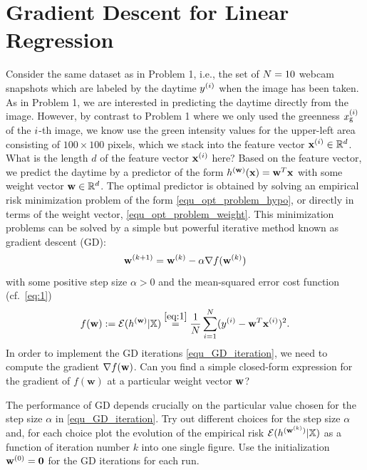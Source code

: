 \documentclass[article,11pt]{article}
\begin{document}
\section{Gradient Descent for Linear Regression}
Consider the same dataset as in Problem 1, i.e., the set of $N=10$ webcam snapshots which are labeled by the daytime $y^{(i)}$ 
when the image has been taken. As in Problem 1, we are interested in predicting the daytime directly from the image. However, by contrast 
to Problem 1 where we only used the greenness $x_{\rm g}^{(i)}$ of the $i$-th image, we know use the green intensity 
values for the upper-left area consisting of $100 \times 100$ pixels, 
which we stack into the feature vector ${\bf x}^{(i)} \in \mathbb{R}^{d}$. What is the length $d$ of the feature vector ${\bf x}^{(i)}$ here? 
Based on the feature vector, we predict the daytime by a predictor of the form $h^{({\bf w})}({\bf x}) = {\bf w}^{T} {\bf x}$ with some weight vector ${\bf w} \in \mathbb{R}^{d}$. 
The optimal predictor is obtained by solving an empirical risk minimization problem of the form \eqref{equ_opt_problem_hypo}, 
or directly in terms of the weight vector, \eqref{equ_opt_problem_weight}. This minimization problems can be solved by a simple but powerful iterative method 
known as gradient descent (GD): 
\vspace*{-2mm}
\begin{equation}
\label{equ_GD_iteration}
    \vw^{(k+1)} = \vw^{(k)} - \alpha \nabla f(\vw^{(k)}) 
 \vspace*{-2mm}
\end{equation}
with some positive step size $\alpha >0$ and the mean-squared error cost function (cf.\ \eqref{eq:1}) 
\vspace*{-2mm}
\begin{equation} 
f(\vw) \defeq \emperror(h^{(\vw)}|\dataset) \stackrel{\eqref{eq:1}}{=} \frac{1}{\samplesize}\sum^{\samplesize}_{\sampleidx=1}(y^{(\sampleidx)} - \vw^{T} \vx^{(\sampleidx)})^2. \nonumber
\vspace*{-2mm}
\end{equation} 
In order to implement the GD iterations \eqref{equ_GD_iteration}, we need to compute the gradient $\nabla f({\bf w})$. 
Can you find a simple closed-form expression for the gradient of $f(\mathbf{w})$ at a particular weight vector ${\bf w}$?

The performance of GD depends crucially on the particular value chosen for the step size $\alpha$ in \eqref{equ_GD_iteration}. 
Try out different choices for the step size $\alpha$ and, for each choice plot the evolution of the empirical risk 
$\mathcal{E}(h^{({\bf w}^{(k)})}| \mathbb{X})$ as a function of iteration number $k$ into one single figure. 
Use the initialization ${\bf w}^{(0)} = \mathbf{0}$ for the GD iterations for each run. 
\end{document}
